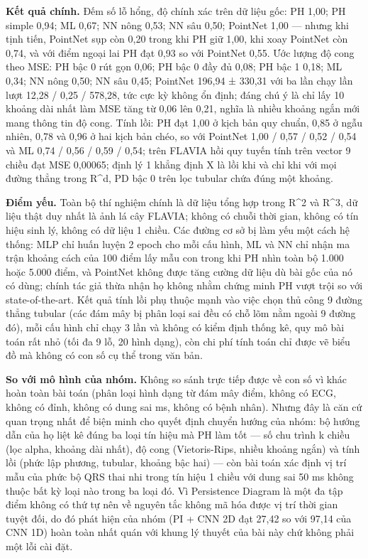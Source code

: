 \documentclass[12pt,a4paper]{article}
\begin{document}
\noindent \textbf{Kết quả chính.} Đếm số lỗ hổng, độ chính xác trên dữ liệu gốc: PH 1,00; PH simple 0,94; ML 0,67; NN nông 0,53; NN sâu 0,50; PointNet 1,00 — nhưng khi tịnh tiến, PointNet sụp còn 0,20 trong khi PH giữ 1,00, khi xoay PointNet còn 0,74, và với điểm ngoại lai PH đạt 0,93 so với PointNet 0,55. Ước lượng độ cong theo MSE: PH bậc 0 rút gọn 0,06; PH bậc 0 đầy đủ 0,08; PH bậc 1 0,18; ML 0,34; NN nông 0,50; NN sâu 0,45; PointNet 196,94 ± 330,31 với ba lần chạy lần lượt 12,28 / 0,25 / 578,28, tức cực kỳ không ổn định; đáng chú ý là chỉ lấy 10 khoảng dài nhất làm MSE tăng từ 0,06 lên 0,21, nghĩa là nhiều khoảng ngắn mới mang thông tin độ cong. Tính lồi: PH đạt 1,00 ở kịch bản quy chuẩn, 0,85 ở ngẫu nhiên, 0,78 và 0,96 ở hai kịch bản chéo, so với PointNet 1,00 / 0,57 / 0,52 / 0,54 và ML 0,74 / 0,56 / 0,59 / 0,54; trên FLAVIA hồi quy tuyến tính trên vector 9 chiều đạt MSE 0,00065; định lý 1 khẳng định X là lồi khi và chỉ khi với mọi đường thẳng trong R\textasciicircum{}d, PD bậc 0 trên lọc tubular chứa đúng một khoảng.\par\vspace{3pt}
\noindent \textbf{Điểm yếu.} Toàn bộ thí nghiệm chính là dữ liệu tổng hợp trong R\textasciicircum{}2 và R\textasciicircum{}3, dữ liệu thật duy nhất là ảnh lá cây FLAVIA; không có chuỗi thời gian, không có tín hiệu sinh lý, không có dữ liệu 1 chiều. Các đường cơ sở bị làm yếu một cách hệ thống: MLP chỉ huấn luyện 2 epoch cho mỗi cấu hình, ML và NN chỉ nhận ma trận khoảng cách của 100 điểm lấy mẫu con trong khi PH nhìn toàn bộ 1.000 hoặc 5.000 điểm, và PointNet không được tăng cường dữ liệu dù bài gốc của nó có dùng; chính tác giả thừa nhận họ không nhằm chứng minh PH vượt trội so với state-of-the-art. Kết quả tính lồi phụ thuộc mạnh vào việc chọn thủ công 9 đường thẳng tubular (các đám mây bị phân loại sai đều có chỗ lõm nằm ngoài 9 đường đó), mỗi cấu hình chỉ chạy 3 lần và không có kiểm định thống kê, quy mô bài toán rất nhỏ (tối đa 9 lỗ, 20 hình dạng), còn chi phí tính toán chỉ được vẽ biểu đồ mà không có con số cụ thể trong văn bản.\par\vspace{3pt}
\noindent \textbf{\color{tdtblue}So với mô hình của nhóm.} Không so sánh trực tiếp được về con số vì khác hoàn toàn bài toán (phân loại hình dạng từ đám mây điểm, không có ECG, không có đỉnh, không có dung sai ms, không có bệnh nhân). Nhưng đây là căn cứ quan trọng nhất để biện minh cho quyết định chuyển hướng của nhóm: bộ hướng dẫn của họ liệt kê đúng ba loại tín hiệu mà PH làm tốt — số chu trình k chiều (lọc alpha, khoảng dài nhất), độ cong (Vietoris-Rips, nhiều khoảng ngắn) và tính lồi (phức lập phương, tubular, khoảng bậc hai) — còn bài toán xác định vị trí mẫu của phức bộ QRS thai nhi trong tín hiệu 1 chiều với dung sai 50 ms không thuộc bất kỳ loại nào trong ba loại đó. Vì Persistence Diagram là một đa tập điểm không có thứ tự nên về nguyên tắc không mã hóa được vị trí thời gian tuyệt đối, do đó phát hiện của nhóm (PI + CNN 2D đạt 27,42 so với 97,14 của CNN 1D) hoàn toàn nhất quán với khung lý thuyết của bài này chứ không phải một lỗi cài đặt.\par\vspace{3pt}
\end{document}
